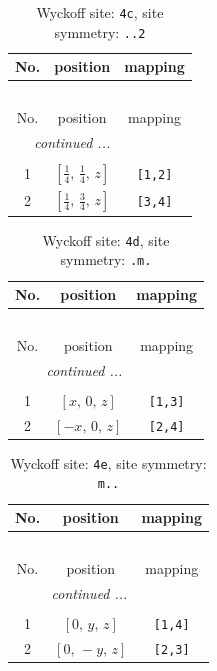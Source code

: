 \documentclass[fleqn,8pt]{jsarticle}
\begin{document}
\begin{longtable}{ccc}
\caption{Wyckoff site: {\tt 4c}, site symmetry: {\tt ..2}}
 \\
 \hline \hline
No. & position & mapping \\ \hline \endfirsthead

\multicolumn{2}{l}{\tablename\ \thetable{}} \\
 \hline \hline
No. & position & mapping \\ \hline \endhead

 \hline \hline
\multicolumn{2}{r}{\footnotesize\it continued ...} \\ \endfoot

 \hline \hline
\multicolumn{2}{r}{} \\ \endlastfoot

1 & $\left[ \frac{1}{4},\, \frac{1}{4},\, z \right]$ & {\tt [1,2]} \\ \hline
2 & $\left[ \frac{1}{4},\, \frac{3}{4},\, z \right]$ & {\tt [3,4]} \\
\end{longtable}
\renewcommand{\arraystretch}{1.2}
\begin{longtable}{ccc}
\caption{Wyckoff site: {\tt 4d}, site symmetry: {\tt .m.}}
 \\
 \hline \hline
No. & position & mapping \\ \hline \endfirsthead

\multicolumn{2}{l}{\tablename\ \thetable{}} \\
 \hline \hline
No. & position & mapping \\ \hline \endhead

 \hline \hline
\multicolumn{2}{r}{\footnotesize\it continued ...} \\ \endfoot

 \hline \hline
\multicolumn{2}{r}{} \\ \endlastfoot

1 & $\left[ x,\, 0,\, z \right]$ & {\tt [1,3]} \\ \hline
2 & $\left[ - x,\, 0,\, z \right]$ & {\tt [2,4]} \\
\end{longtable}
\renewcommand{\arraystretch}{1.2}
\begin{longtable}{ccc}
\caption{Wyckoff site: {\tt 4e}, site symmetry: {\tt m..}}
 \\
 \hline \hline
No. & position & mapping \\ \hline \endfirsthead

\multicolumn{2}{l}{\tablename\ \thetable{}} \\
 \hline \hline
No. & position & mapping \\ \hline \endhead

 \hline \hline
\multicolumn{2}{r}{\footnotesize\it continued ...} \\ \endfoot

 \hline \hline
\multicolumn{2}{r}{} \\ \endlastfoot

1 & $\left[ 0,\, y,\, z \right]$ & {\tt [1,4]} \\ \hline
2 & $\left[ 0,\, - y,\, z \right]$ & {\tt [2,3]} \\
\end{longtable}
\end{document}
